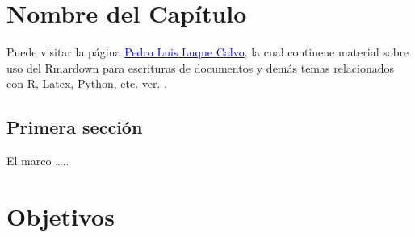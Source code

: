 \documentclass[12pt,a4paper,]{book}
\def\ifdoblecara{} %
\def\ifprincipal{} %
\numberwithin{dummy}{section}
\theoremstyle{ocrenumbox}
\theoremstyle{ocrenumbox}
\theoremstyle{ocrenumbox}
\theoremstyle{ocrenumbox}
\theoremstyle{ocrenum}
\begin{document}
\renewcommand{\headrulewidth}{0.4pt}
\renewcommand{\footrulewidth}{0.4pt}

\ifdefined\ifprincipal
\else
\setlength{\parindent}{1em}
\pagestyle{fancy}
\setcounter{tocdepth}{4}
\tableofcontents

\fi

\ifdefined\ifdoblecara
\fancyhead{}{}
\fancyhead[LE,RO]{\scriptsize\rightmark}
\fancyfoot[LO,RE]{\scriptsize\slshape \leftmark}
\fancyfoot[C]{}
\fancyfoot[LE,RO]{\footnotesize\thepage}
\else
\fancyhead{}{}
\fancyhead[RO]{\scriptsize\rightmark}
\fancyfoot[LO]{\scriptsize\slshape \leftmark}
\fancyfoot[C]{}
\fancyfoot[RO]{\footnotesize\thepage}
\fi

\renewcommand{\headrulewidth}{0.4pt}
\renewcommand{\footrulewidth}{0.4pt}

\hypertarget{nombre-del-capuxedtulo}{%
\chapter{Nombre del Capítulo}\label{nombre-del-capuxedtulo}}

Puede visitar la página
\href{http://destio.us.es/calvo/}{\textcolor{blue}{Pedro Luis Luque Calvo}},
la cual continene material sobre uso del Rmardown para escrituras de
documentos y demás temas relacionados con R, Latex, Python, etc. ver.
\cite{Luque2017}.

\hypertarget{primera-secciuxf3n}{%
\section{Primera sección}\label{primera-secciuxf3n}}

El marco \cite{libro1} \ldots..

\FloatBarrier

\ifdefined\ifprincipal
\else
\setlength{\parindent}{1em}
\pagestyle{fancy}
\setcounter{tocdepth}{4}
\tableofcontents

\fi

\ifdefined\ifdoblecara
\fancyhead{}{}
\fancyhead[LE,RO]{\scriptsize\rightmark}
\fancyfoot[LO,RE]{\scriptsize\slshape \leftmark}
\fancyfoot[C]{}
\fancyfoot[LE,RO]{\footnotesize\thepage}
\else
\fancyhead{}{}
\fancyhead[RO]{\scriptsize\rightmark}
\fancyfoot[LO]{\scriptsize\slshape \leftmark}
\fancyfoot[C]{}
\fancyfoot[RO]{\footnotesize\thepage}
\fi

\renewcommand{\headrulewidth}{0.4pt}
\renewcommand{\footrulewidth}{0.4pt}

\hypertarget{objetivos}{%
\chapter{Objetivos}\label{objetivos}}
\end{document}
